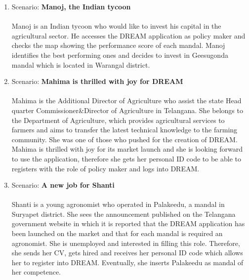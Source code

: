 \begin{enumerate}
\item Scenario: \textbf{Manoj, the Indian tycoon}\\\\
Manoj is an Indian tycoon who would like to invest his capital in the agricultural sector. He accesses the DREAM application as policy maker and checks the map showing the performance score of each mandal. Manoj identifies the best performing ones and decides to invest in Geesugonda mandal which is located in Warangal district.\\

\item Scenario: \textbf{Mahima is thrilled with joy for DREAM}\\\\
Mahima is the Additional Director of Agriculture who assist the state Head quarter Commissioner\&Director of Agriculture in Telangana. She belongs to the Department of Agriculture, which provides agricultural services to farmers and aims to transfer the latest technical knowledge to the farming community. She was one of those who pushed for the creation of DREAM.
Mahima is thrilled with joy for its market launch and she is looking forward to use the application, therefore she gets her personal ID code to be able to registers with the role of policy maker and logs into DREAM.\\

\item Scenario: \textbf{A new job for Shanti}\\\\
Shanti is a young agronomist who operated in Palakeedu, a mandal in Suryapet district. She sees the announcement published on the Telangana government website in which it is reported that the DREAM application has been launched on the market and that for each mandal is required an agronomist. She is unemployed and interested in filling this role. Therefore, she sends her CV, gets hired and receives her personal ID code which allows her to register into DREAM. Eventually, she inserts Palakeedu as mandal of her competence.\\


\end{enumerate}
